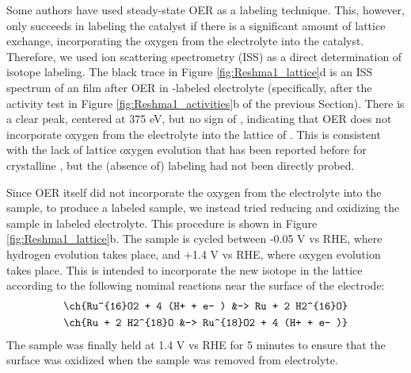 Some authors have used steady-state OER as a labeling technique\cite{Stoerzinger2017, Grimaud2017}. This, however, only succeeds in labeling the catalyst if there is a significant amount of lattice exchange, incorporating the oxygen from the electrolyte into the catalyst. Therefore, we used ion scattering spectrometry (ISS) as a direct determination of isotope labeling. The black trace in Figure \ref{fig:Reshma1_lattice}d is an ISS spectrum of an  film after OER in -labeled electrolyte (specifically, after the activity test in Figure \ref{fig:Reshma1_activities}b of the previous Section). There is a clear  peak, centered at 375 eV, but no sign of , indicating that OER does not incorporate oxygen from the electrolyte into the lattice of . This is consistent with the lack of lattice oxygen evolution that has been reported before for crystalline \cite{Stoerzinger2017}, but the (absence of) labeling had not been directly probed. 

Since OER itself did not incorporate the oxygen from the electrolyte into the sample, to produce a labeled sample, we instead tried reducing and oxidizing the sample in labeled electrolyte. This procedure is shown in Figure \ref{fig:Reshma1_lattice}b. The sample is cycled between -0.05 V vs RHE, where hydrogen evolution takes place, and +1.4 V vs RHE, where oxygen evolution takes place. This is intended to incorporate the new isotope in the lattice according to the following nominal reactions near the surface of the electrode:
\begin{align}
\ch{Ru^{16}O2 + 4 (H+ + e- ) &-> Ru + 2 H2^{16}O}\nonumber\\
\ch{Ru + 2 H2^{18}O &-> Ru^{18}O2 + 4 (H+ + e- )}\label{rxn:Ru_labeling}
\end{align}
The sample was finally held at 1.4 V vs RHE for 5 minutes to ensure that the surface was oxidized when the sample was removed from electrolyte. 

